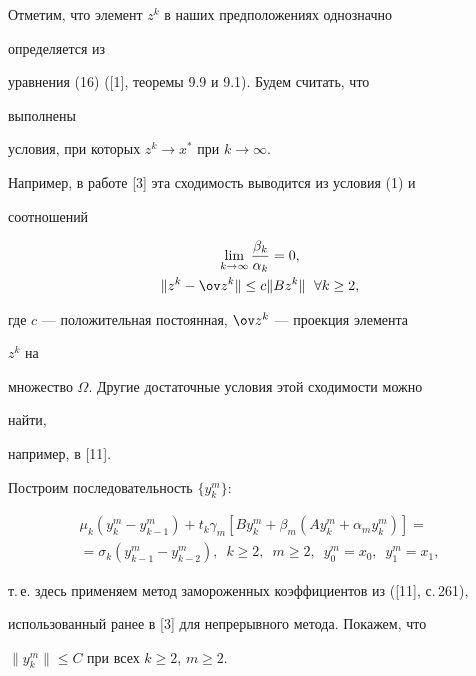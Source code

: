Отметим, что элемент $z^k$ в наших предположениях однозначно


определяется из


уравнения (16) ([1], теоремы 9.9 и 9.1). Будем считать, что


выполнены


условия, при которых $z^k \rightarrow x^*$ при $k \rightarrow \infty$.


Например, в работе [3] эта сходимость выводится из условия (1) и


соотношений


\begin{gather}\label {17}


\lim_{k \rightarrow \infty }\frac{\beta_k}{\alpha_k}=0, \\


%


\label {18}


\|z^k-\ov z^k\| \leq c\|Bz^k\| \ \;\forall k \geq 2,


\end{gather}


где $c$ --- положительная постоянная, $\ov z^k$ --- проекция элемента


$z^k$ на


множество $\Omega $. Другие достаточные условия этой сходимости можно


найти,


например, в [11].





Построим последовательность $\{y_k^m\}:$


\begin{multline}\label {19}


\mu_k(y_k^m-y_{k-1}^m)+t_k\gamma_m[By_k^m+\beta_m(Ay_k^m+


\alpha_my_k^m)]= \\


%


=\sigma_k(y_{k-1}^m-y_{k-2}^m),\ \;k\geq 2,\ \;m\geq


2,\ \;y_0^m=x_0,\ \;y_1^m=x_1,


\end{multline}


т.\,е. здесь применяем метод замороженных коэффициентов из ([11], с.\,261),


использованный ранее в [3] для непрерывного метода. Покажем, что


$\|y_k^m\|\leq C$ при всех $k\geq 2$, $m\geq 2$.


